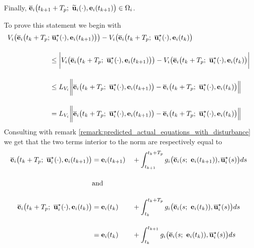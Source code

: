 Finally, $\overline{\bm{\mathbf{e}}}_i\big(t_{k+1} + T_p;\ \widetilde{\bm{\mathbf{u}}}_i(\cdot), \bm{\mathbf{e}}_i(t_{k+1}) \big) \in \Omega_i$.
\begin{gg_box}
To prove this statement we begin with
\begin{align}
  V_i\big(\overline{\vect{e}}_i\big(t_k + T_p;&\ \overline{\vect{u}}_i^{\star}(\cdot), \vect{e}_i(t_{k+1})\big)\big)
    - V_i\big(\overline{\vect{e}}_i\big(t_k + T_p;\ \overline{\vect{u}}_i^{\star}(\cdot), \vect{e}_i(t_k)\big) \\[2.5ex]
  &\leq \bigg|  V_i\big(\overline{\vect{e}}_i\big(t_k + T_p;\ \overline{\vect{u}}_i^{\star}(\cdot), \vect{e}_i(t_{k+1})\big)\big)
    - V_i\big(\overline{\vect{e}}_i\big(t_k + T_p;\ \overline{\vect{u}}_i^{\star}(\cdot), \vect{e}_i(t_k)\big) \bigg | \\[2.5ex]
  &\leq L_{V_i}\bigg \| \overline{\vect{e}}_i\big(t_k + T_p;\ \overline{\vect{u}}_i^{\star}(\cdot), \vect{e}_i(t_{k+1})\big)
    - \overline{\vect{e}}_i\big(t_k + T_p;\ \overline{\vect{u}}_i^{\star}(\cdot), \vect{e}_i(t_k) \big)\Big\| \\[2.5ex]
  &=  L_{V_i}\bigg \|  \overline{\vect{e}}_i\big(t_k + T_p;\ \overline{\vect{u}}_i^{\star}(\cdot), \vect{e}_i(t_{k+1})\big)
    - \overline{\vect{e}}_i\big(t_k + T_p;\ \overline{\vect{u}}_i^{\star}(\cdot), \vect{e}_i(t_k) \big)\Big\|
\label{eq:from_DV_to_De}
\end{align}
Consulting with remark \eqref{remark:predicted_actual_equations_with_disturbance}
we get that the two terms interior to the norm are respectively equal to
\begin{alignat}{2}
  \overline{\vect{e}}_i\big(t_k + T_p;\ \overline{\vect{u}}_i^{\star}(\cdot), \vect{e}_i(t_{k+1})\big)
    &= \vect{e}_i(t_{k+1}) &&+ \int_{t_{k+1}}^{t_k + T_p} g_i\big(\overline{\vect{e}}_i(s;\ \vect{e}_i(t_{k+1})), \overline{\vect{u}}_i^{\star}(s) \big)ds \\[2.5ex]
    &\text{and}\\[2.5ex]
  \overline{\vect{e}}_i\big(t_k + T_p;\ \overline{\vect{u}}_i^{\star}(\cdot), \vect{e}_i(t_k)\big)
    &= \vect{e}_i(t_k)     &&+ \int_{t_k}^{t_k + T_p} g_i\big(\overline{\vect{e}}_i(s;\ \vect{e}_i(t_k)), \overline{\vect{u}}_i^{\star}(s) \big)ds \\[2.5ex]
    &= \vect{e}_i(t_k)     &&+ \int_{t_k}^{t_{k+1}} g_i\big(\overline{\vect{e}}_i(s;\ \vect{e}_i(t_k)), \overline{\vect{u}}_i^{\star}(s) \big)ds \\[2.5ex]

\end{alignat}
\end{gg_box}
